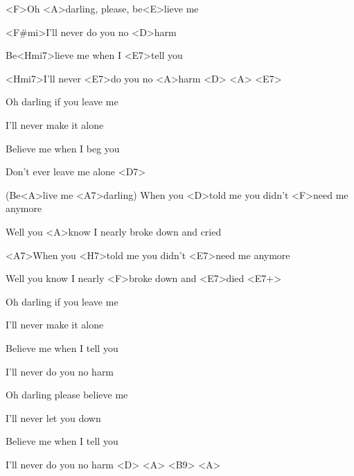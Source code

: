

\zs
<F>Oh <A>darling, please, be<E>lieve me 

<F#mi>I'll never do you no <D>harm 

Be<Hmi7>lieve me when I <E7>tell you 

<Hmi7>I'll never <E7>do you no <A>harm <D> <A> <E7>
\ks

\zs
Oh darling if you leave me 

I'll never make it alone 

Believe me when I beg you 

Don't ever leave me alone <D7> 
\ks

\zr
(Be<A>live me <A7>darling) When you <D>told me you didn't <F>need me anymore 

Well you <A>know I nearly broke down and cried 

<A7>When you <H7>told me you didn't <E7>need me anymore 

Well you know I nearly <F>broke down and <E7>died <E7+> 
\kr

\zs
Oh darling if you leave me 

I'll never make it alone 

Believe me when I tell you 

I'll never do you no harm
\ks

\zr
\kr 

\zs
Oh darling please believe me 

I'll never let you down 

Believe me when I tell you 

I'll never do you no harm <D> <A> <B9> <A>
\ks

\kp
